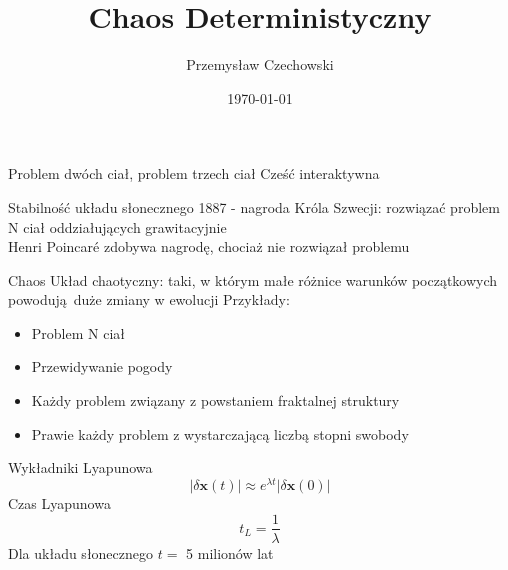 \documentclass{beamer}
\begin{document}
\title{Chaos Deterministyczny} 
\author{Przemysław Czechowski} 
\date{\today} 

\frame{\titlepage} 


\begin{frame}{Problem dwóch ciał, problem trzech ciał}
Cześć interaktywna
\end{frame}
\begin{frame}{Stabilność układu słonecznego}
1887 - nagroda Króla Szwecji: rozwiązać problem N ciał oddziałujących grawitacyjnie\pause\\
Henri Poincaré zdobywa nagrodę, chociaż nie rozwiązał problemu
\end{frame}

\begin{frame}{Chaos}
Układ chaotyczny: taki, w którym małe różnice warunków początkowych powodują duże zmiany w ewolucji\pause
Przykłady:
\begin{itemize}
\item Problem N ciał
\item Przewidywanie pogody
\item Każdy problem związany z powstaniem fraktalnej struktury
\item Prawie każdy problem z wystarczającą liczbą stopni swobody
\end{itemize} 
\end{frame}

\begin{frame}{Wykładniki Lyapunowa}
\begin{equation}
| \delta\mathbf{x}(t) | \approx e^{\lambda t} | \delta \mathbf{x}(0) |
\end{equation}\pause
Czas Lyapunowa
\begin{equation}
t_L = \frac{1}{\lambda}
\end{equation}\pause
Dla układu słonecznego $t=$ 5 milionów lat \cite{laskar1989numerical}

\end{frame}
\begin{frame}
\nocite{stewart1994czy}
{}

\end{frame}
\end{document}
